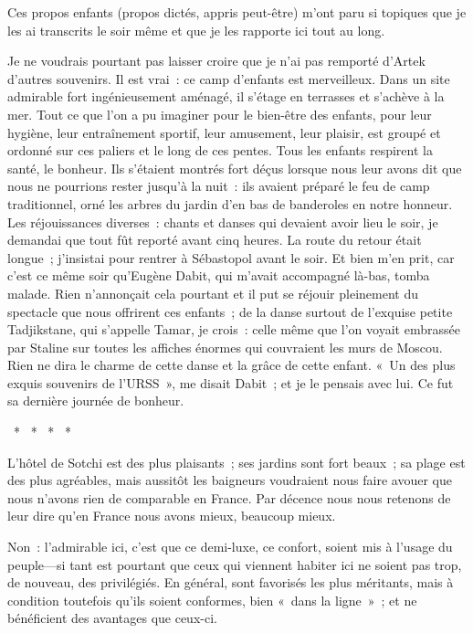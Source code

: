 \documentclass[french,twoside]{book} %
\begin{document}
Ces propos enfants (propos dictés, appris peut-être) m’ont paru si topiques que je les ai transcrits le soir même et que je les rapporte ici tout au long.\par
Je ne voudrais pourtant pas laisser croire que je n’ai pas remporté d’Artek d’autres souvenirs. Il est vrai : ce camp d’enfants est merveilleux. Dans un site admirable fort ingénieusement aménagé, il s’étage en terrasses et s’achève à la mer. Tout ce que l’on a pu imaginer pour le bien-être des enfants, pour leur hygiène, leur entraînement sportif, leur amusement, leur plaisir, est groupé et ordonné sur ces paliers et le long de ces pentes. Tous les enfants respirent la santé, le bonheur. Ils s’étaient montrés fort déçus lorsque nous leur avons dit que nous ne pourrions rester jusqu’à la nuit : ils avaient préparé le feu de camp traditionnel, orné les arbres du jardin d’en bas de banderoles en notre honneur. Les réjouissances diverses : chants et danses qui devaient avoir lieu le soir, je demandai que tout fût reporté avant cinq heures. La route du retour était longue ; j’insistai pour rentrer à Sébastopol avant le soir. Et bien m’en prit, car c’est ce même soir qu’Eugène Dabit, qui m’avait accompagné là-bas, tomba malade. Rien n’annonçait cela pourtant et il put se réjouir pleinement du spectacle que nous offrirent ces enfants ; de la danse surtout de l’exquise petite Tadjikstane, qui s’appelle Tamar, je crois : celle même que l’on voyait embrassée par Staline sur toutes les affiches énormes qui couvraient les murs de Moscou. Rien ne dira le charme de cette danse et la grâce de cette enfant. « Un des plus exquis souvenirs de l’URSS », me disait Dabit ; et je le pensais avec lui. Ce fut sa dernière journée de bonheur.\par
\bigbreak
{\centering *  *  *  *  *\par}
\bigbreak
\noindent L’hôtel de Sotchi est des plus plaisants ; ses jardins sont fort beaux ; sa plage est des plus agréables, mais aussitôt les baigneurs voudraient nous faire avouer que nous n’avons rien de comparable en France. Par décence nous nous retenons de leur dire qu’en France nous avons mieux, beaucoup mieux.\par
Non : l’admirable ici, c’est que ce demi-luxe, ce confort, soient mis à l’usage du peuple—si tant est pourtant que ceux qui viennent habiter ici ne soient pas trop, de nouveau, des privilégiés. En général, sont favorisés les plus méritants, mais à condition toutefois qu’ils soient conformes, bien « dans la ligne » ; et ne bénéficient des avantages que ceux-ci.\par
\end{document}
